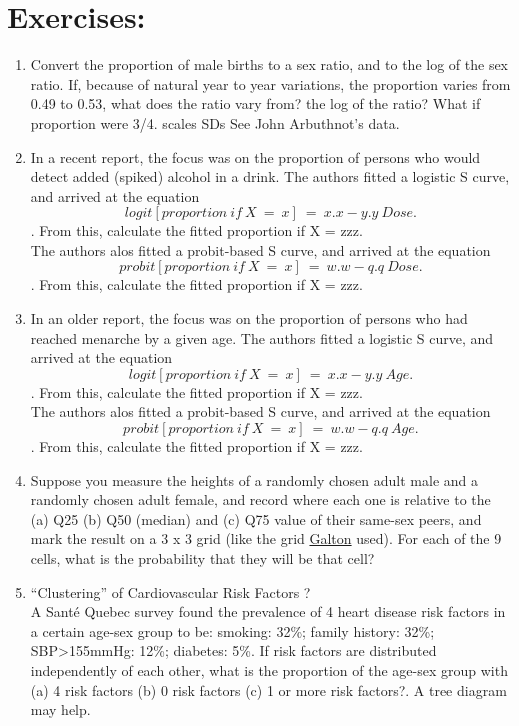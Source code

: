 \documentclass[]{book}
\begin{document}
\hypertarget{exercises-1}{%
\section{Exercises:}\label{exercises-1}}

\begin{enumerate}
\def\labelenumi{\arabic{enumi}.}
\item
  Convert the proportion of male births to a sex ratio, and to the log of the sex ratio. If, because of natural year to year variations, the proportion varies from 0.49 to 0.53, what does the ratio vary from? the log of the ratio? What if proportion were 3/4. scales SDs See John Arbuthnot's data.
\item
  In a recent report, the focus was on the proportion of persons who would detect added (spiked) alcohol in a drink. The authors fitted a logistic S curve, and arrived at the equation \[ logit[proportion \ if  \ X \  = \ x] \ = \ x.x - y.y \ Dose.\]. From this, calculate the fitted proportion if X = zzz.\\
  The authors alos fitted a probit-based S curve, and arrived at the equation \[ probit[proportion \ if  \ X \  = \ x] \ = \ w.w - q.q \ Dose.\]. From this, calculate the fitted proportion if X = zzz.
\item
  In an older report, the focus was on the proportion of persons who had reached menarche by a given age. The authors fitted a logistic S curve, and arrived at the equation \[ logit[proportion \ if  \ X \  = \ x] \ = \ x.x - y.y \ Age.\]. From this, calculate the fitted proportion if X = zzz.\\
  The authors alos fitted a probit-based S curve, and arrived at the equation \[ probit[proportion \ if  \ X \  = \ x] \ = \ w.w - q.q \ Age.\]. From this, calculate the fitted proportion if X = zzz.
\item
  Suppose you measure the heights of a randomly chosen adult male and a randomly chosen adult female, and record where each one is relative to the (a) Q25 (b) Q50 (median) and (c) Q75 value of their same-sex peers, and mark the result on a 3 x 3 grid (like the grid \href{http://www.biostat.mcgill.ca/hanley/statbook/GaltonHeightCouples.png}{Galton} used). For each of the 9 cells, what is the probability that they will be that cell?
\item
  ``Clustering'' of Cardiovascular Risk Factors ?\\
  A Santé Quebec survey found the prevalence of 4 heart disease risk factors in a certain age-sex group to be: smoking: 32\%; family history: 32\%; SBP\textgreater{}155mmHg: 12\%; diabetes: 5\%. If risk factors are distributed independently of each other, what is the proportion of the age-sex group with (a) 4 risk factors (b) 0 risk factors (c) 1 or more risk factors?. A tree diagram may help.

\end{enumerate}
\end{document}
